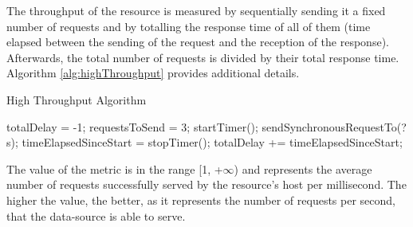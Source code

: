 The throughput of the resource is measured by sequentially sending it a fixed number of requests and by totalling the response time of all of them (time elapsed between the sending of the request and the reception of the response). Afterwards, the total number of requests is divided by their total response time. Algorithm \ref{alg:highThroughput} provides additional details.
\begin{algorithm}
\caption{High Throughput Algorithm} \label{alg:highThroughput}
\begin{algorithmic}[1]
\State totalDelay = -1;
\State requestsToSend = 3;
\EndProcedure
{}
\State startTimer();
\State sendSynchronousRequestTo(?s);
\EndFor
\State timeElapsedSinceStart = stopTimer();
\State totalDelay += timeElapsedSinceStart;
\EndIf
{}
\EndProcedure
\end{algorithmic}
\end{algorithm}
The value of the metric is in the range [1, +$\infty$) and represents the average number of requests successfully served by the resource's host per millisecond. The higher the value, the better, as it represents the number of requests per second, that the data-source is able to serve.




